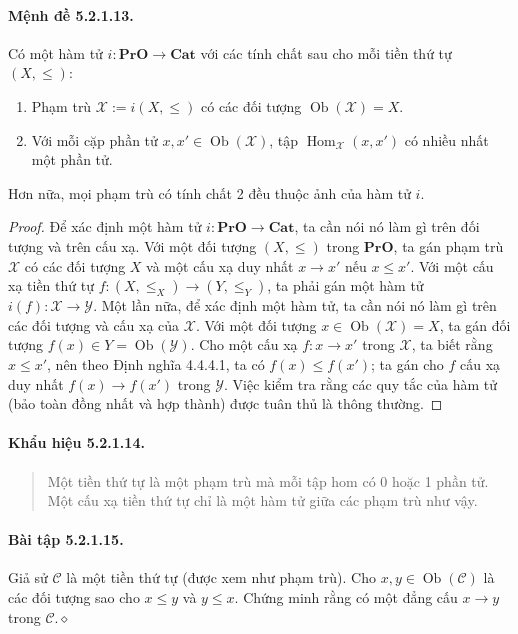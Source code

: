 \paragraph{Mệnh đề 5.2.1.13.} Có một hàm tử $i:\mathbf{PrO}\to\mathbf{Cat}$ với các tính chất sau cho mỗi tiền thứ tự $(X,\leq)$:
\begin{enumerate}[label=\arabic*.]
\item Phạm trù $\mathcal X:=i(X,\leq)$ có các đối tượng $\operatorname{Ob}(\mathcal X)=X$.
\item Với mỗi cặp phần tử $x,x'\in\operatorname{Ob}(\mathcal X)$, tập $\operatorname{Hom}_{\mathcal X}(x,x')$ có nhiều nhất một phần tử.
\end{enumerate}
Hơn nữa, mọi phạm trù có tính chất 2 đều thuộc ảnh của hàm tử $i$.
\begin{proof}Để xác định một hàm tử $i:\mathbf{PrO}\to\mathbf{Cat}$, ta cần nói nó làm gì trên đối tượng và trên cấu xạ. Với một đối tượng $(X,\leq)$ trong $\mathbf{PrO}$, ta gán phạm trù $\mathcal X$ có các đối tượng $X$ và một cấu xạ duy nhất $x\to x'$ nếu $x\leq x'$. Với một cấu xạ tiền thứ tự $f:(X,\leq_X)\to(Y,\leq_Y)$, ta phải gán một hàm tử $i(f):\mathcal X\to\mathcal Y$. Một lần nữa, để xác định một hàm tử, ta cần nói nó làm gì trên các đối tượng và cấu xạ của $\mathcal X$. Với một đối tượng $x\in\operatorname{Ob}(\mathcal X)=X$, ta gán đối tượng $f(x)\in Y=\operatorname{Ob}(\mathcal Y)$. Cho một cấu xạ $f:x\to x'$ trong $\mathcal X$, ta biết rằng $x\leq x'$, nên theo Định nghĩa 4.4.4.1, ta có $f(x)\leq f(x')$; ta gán cho $f$ cấu xạ duy nhất $f(x)\to f(x')$ trong $\mathcal Y$. Việc kiểm tra rằng các quy tắc của hàm tử (bảo toàn đồng nhất và hợp thành) được tuân thủ là thông thường.\end{proof}
\paragraph{Khẩu hiệu 5.2.1.14.}\begin{quote}Một tiền thứ tự là một phạm trù mà mỗi tập hom có 0 hoặc 1 phần tử. Một cấu xạ tiền thứ tự chỉ là một hàm tử giữa các phạm trù như vậy.\end{quote}
\paragraph{Bài tập 5.2.1.15.} Giả sử $\mathcal C$ là một tiền thứ tự (được xem như phạm trù). Cho $x,y\in\operatorname{Ob}(\mathcal C)$ là các đối tượng sao cho $x\leq y$ và $y\leq x$. Chứng minh rằng có một đẳng cấu $x\to y$ trong $\mathcal C$.\hfill$\diamond$
